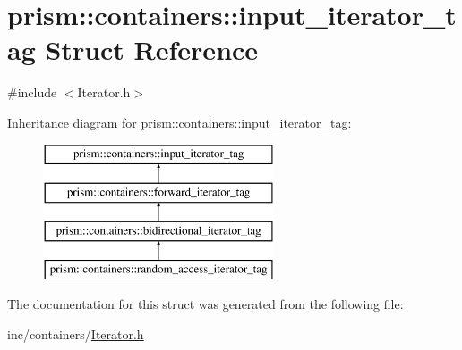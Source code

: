 \hypertarget{structprism_1_1containers_1_1input__iterator__tag}{}\section{prism\+:\+:containers\+:\+:input\+\_\+iterator\+\_\+tag Struct Reference}
\label{structprism_1_1containers_1_1input__iterator__tag}


{\ttfamily \#include $<$Iterator.\+h$>$}

Inheritance diagram for prism\+:\+:containers\+:\+:input\+\_\+iterator\+\_\+tag\+:\begin{figure}[H]
\begin{center}
\leavevmode
\includegraphics[height=4.000000cm]{structprism_1_1containers_1_1input__iterator__tag}
\end{center}
\end{figure}


The documentation for this struct was generated from the following file\+:\begin{DoxyCompactItemize}
\item 
inc/containers/\hyperlink{_iterator_8h}{Iterator.\+h}\end{DoxyCompactItemize}
